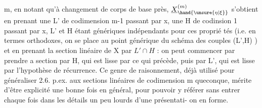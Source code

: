 
m, en notant qu'à changement de corps de base près, $\underline{X}^{(m)}_{\hand{\unsure{\eta|\xi}}}$ s'obtient en
prenant une L' de codimension m-1 passant par x, une H de codinsion
1 passant par x, L' et H étant génériques indépendants pour ces proprié
tés (i.e. en termes orthodoxes, on se place au point générique du 
schéma des couples (L',H)  ) et en prenant la section linéaire
de X par $L'\cap H$ : on peut commencer par prendre a section par H, qui
est lisse par ce qui précède, puis par L', qui est lisse par l'hypothèse
de récurrence. Ce genre de raisonnement, déjà utilisé pour généraliser
2.6. p.ex. aux sections linéaires de codimension m queconque, mérite
d'être explicité une bonne fois en général, pour pouvoir y référer sans
entrer  chaque fois dans les détails un peu lourds d'une présentati-%
on en forme.


